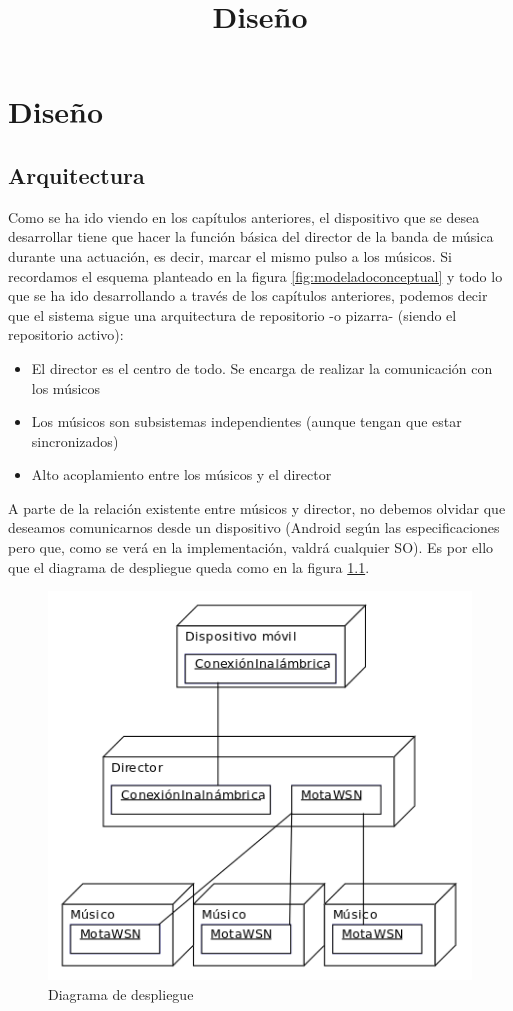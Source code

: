 \chapter{Diseño}
\title{Diseño}
\label{cap:Diseno}

\section{Arquitectura}
Como se ha ido viendo en los capítulos anteriores, el dispositivo que se desea desarrollar
tiene que hacer la función básica del director de la banda de música durante una actuación,
es decir, marcar el mismo pulso a los músicos.
Si recordamos el esquema planteado en la figura \ref{fig:modeladoconceptual} y todo lo
que se ha ido desarrollando a través de los capítulos anteriores, podemos decir
que el sistema sigue una arquitectura de repositorio -o pizarra- (siendo el repositorio activo):

\begin{itemize}
  \item El director es el centro de todo. Se encarga de realizar la comunicación con los músicos
  \item Los músicos son subsistemas independientes (aunque tengan que estar sincronizados)
  \item Alto acoplamiento entre los músicos y el director
\end{itemize}

A parte de la relación existente entre músicos y director, no debemos olvidar que
deseamos comunicarnos desde un dispositivo (Android según las especificaciones pero que,
como se verá en la implementación, valdrá cualquier SO). Es por ello que el diagrama
de despliegue queda como en la figura \ref{fig:diagramadespliegue}.


\begin{figure}[htb]
\centering
\includegraphics[width=1\textwidth]{./imagenes/diagramadespliegue}
\caption{Diagrama de despliegue} \label{fig:diagramadespliegue}
\end{figure}

